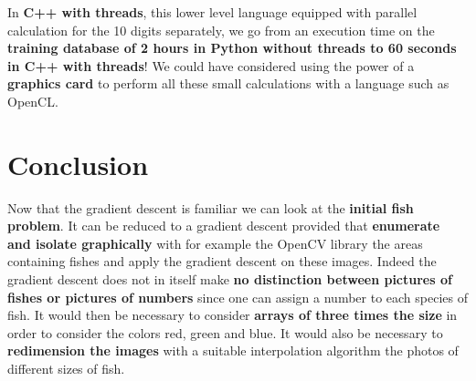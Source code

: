 \documentclass{article}
\begin{document}
	In \textbf{C++ with threads}, this lower level language equipped with parallel calculation for the 10 digits separately, we go from an execution time on the \textbf{training database of 2 hours in Python without threads to 60 seconds in C++ with threads}! We could have considered using the power of a \textbf{graphics card} to perform all these small calculations with a language such as OpenCL.\\
	
	\section{Conclusion}
	
		Now that the gradient descent is familiar we can look at the \textbf{initial fish problem}. It can be reduced to a gradient descent provided that \textbf{enumerate and isolate graphically} with for example the OpenCV library the areas containing fishes and apply the gradient descent on these images. Indeed the gradient descent does not in itself make \textbf{no distinction between pictures of fishes or pictures of numbers} since one can assign a number to each species of fish. It would then be necessary to consider \textbf{arrays of three times the size} in order to consider the colors red, green and blue. It would also be necessary to \textbf{redimension the images} with a suitable interpolation algorithm the photos of different sizes of fish.\\
	
\end{document}
